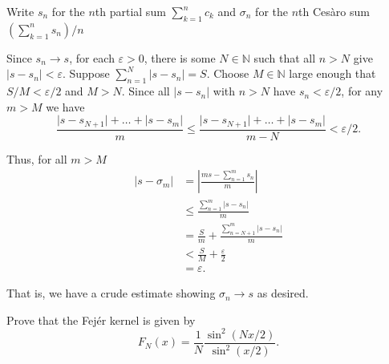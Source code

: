 \documentclass[12 pt, letterpaper]{hmcpset}
\begin{document}
\begin{solution}
	Write $s_{n}$ for the $n$th partial sum $\sum_{k = 1}^{n} c_{k}$ and $\sigma_{n}$ for the $n$th Ces\`aro sum $(\sum_{k = 1}^{n} s_{n})/n$

	Since $s_{n} \to s$, for each $\varepsilon > 0$, there is some $N \in \mathbb{N}$ such that all $n > N$ give $\lvert s - s_{n} \rvert < \varepsilon$. Suppose $\sum_{n = 1}^{N} \lvert s - s_{n} \rvert = S$. Choose $M \in \mathbb{N}$ large enough that $S / M < \varepsilon/2$ and $M > N$. Since all $\lvert s - s_{n} \rvert$ with $n > N$ have $s_{n} < \varepsilon / 2$, for any $m > M$ we have
	\[
		\frac{\lvert s - s_{N + 1} \rvert + \dots + \lvert s - s_{m} \rvert}{m} \le \frac{ \lvert s - s_{N + 1} \rvert + \dots + \lvert s - s_{m} \rvert}{m - N} < \varepsilon / 2.
	\]

	Thus, for all $m > M$
	\begin{align*}
		\lvert s - \sigma_{m} \rvert & = \left \lvert \frac{ms - \sum_{n = 1}^{m} s_{n}}{m} \right \rvert \\
					     & \le \frac{\sum_{n = 1}^{m} \lvert s - s_{n} \rvert}{m} \\
					     & = \frac{S}{m} + \frac{\sum_{n = N + 1}^{m} \lvert s - s_{n} \rvert}{m} \\
					     & < \frac{S}{M} + \frac{\varepsilon}{2} \\
					     & = \varepsilon.
	\end{align*}

	That is, we have a crude estimate showing $\sigma_{n} \to s$ as desired.
\end{solution}

\pagebreak

\begin{problem}[S \& S \S 2.6 \#15]
	Prove that the Fej\'er kernel is given by
	\[
		F_{N}(x) = \frac{1}{N} \frac{\sin^{2}{(Nx / 2)}}{\sin^{2}{(x / 2)}}.
	\]
\end{problem}
\end{document}
